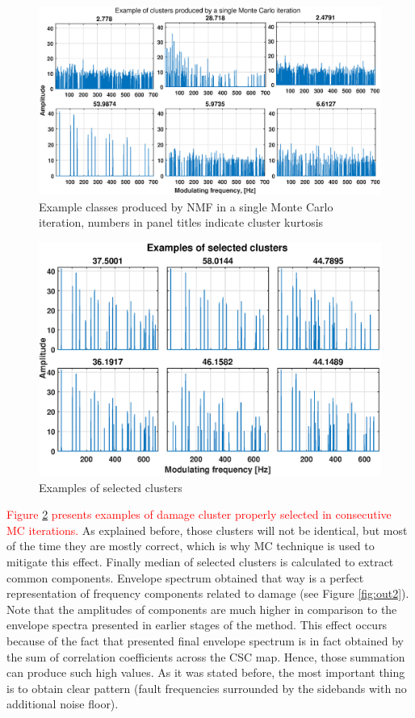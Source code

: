 \documentclass[3p, 12pt]{elsarticle} %
\begin{document}
\begin{figure}[ht!]
\centering
\includegraphics[width=.8\textwidth]{wykresy/clusters.eps}
\caption{Example classes produced by NMF in a single Monte Carlo iteration, numbers in panel titles indicate cluster kurtosis}
\label{fig:classes}
\end{figure}

\begin{figure}[ht!]
\centering
\includegraphics[width=.75\textwidth]{wykresy/multi.eps}
\caption{Examples of selected clusters}
\label{fig:multi}
\end{figure}

\textcolor{red}{Figure \ref{fig:multi} presents examples of damage cluster properly selected in consecutive MC iterations.} As explained before, those clusters will not be identical, but most of the time they are mostly correct, which is why MC technique is used to mitigate this effect. Finally median of selected clusters is calculated to extract common components. Envelope spectrum obtained that way is a perfect representation of frequency components related to damage (see Figure \ref{fig:out2}). Note that the amplitudes of components are much higher in comparison to the envelope spectra presented in earlier stages of the method. This effect occurs because of the fact that presented final envelope spectrum is in fact obtained by the sum of correlation coefficients across the CSC map. Hence, those summation can produce such high values. As it was stated before, the most important thing is to obtain clear pattern (fault frequencies surrounded by the sidebands with no additional noise floor).
\end{document}

